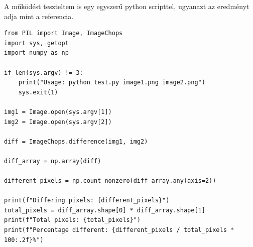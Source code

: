 \documentclass[12pt, letterpaper, a4paper]{article}
\begin{document}
\newpage
A működést teszteltem is egy egyszerű python scripttel, ugyanazt az eredményt adja mint a referencia.

\begin{lstlisting}[style=pythonstyle, caption={Python összehasonlító}, label={lst:python-test}]
from PIL import Image, ImageChops
import sys, getopt
import numpy as np

if len(sys.argv) != 3:
    print("Usage: python test.py image1.png image2.png")
    sys.exit(1)

img1 = Image.open(sys.argv[1])
img2 = Image.open(sys.argv[2])

diff = ImageChops.difference(img1, img2)

diff_array = np.array(diff)

different_pixels = np.count_nonzero(diff_array.any(axis=2))

print(f"Differing pixels: {different_pixels}")
total_pixels = diff_array.shape[0] * diff_array.shape[1]
print(f"Total pixels: {total_pixels}")
print(f"Percentage different: {different_pixels / total_pixels * 100:.2f}%")
\end{lstlisting}


\printbibliography
\end{document}
